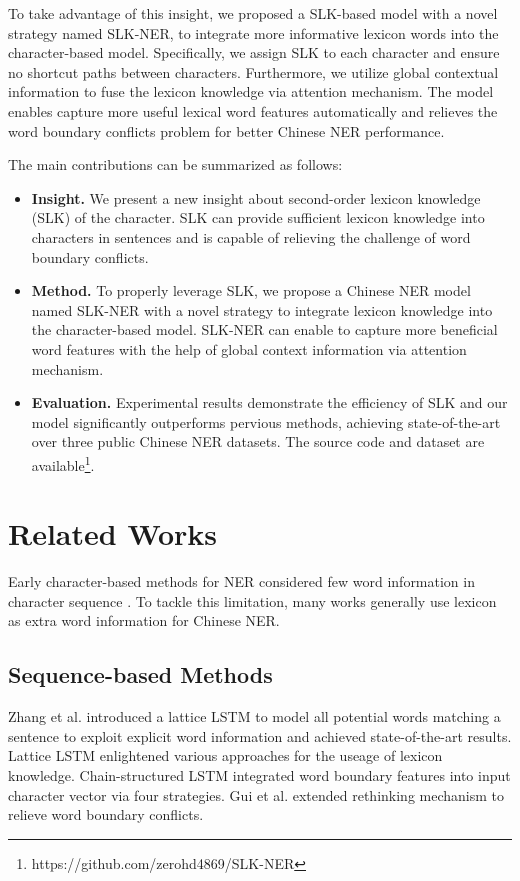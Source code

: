 \documentclass[conference]{IEEEtran}
\begin{document}
To take advantage of this insight, we proposed a SLK-based model with a novel strategy named SLK-NER,
to integrate more informative lexicon words into the character-based model.
Specifically, we assign SLK to each character and ensure no shortcut paths between characters. 
Furthermore, we 
utilize global contextual information to fuse the lexicon knowledge via attention mechanism. 
The model enables capture more useful lexical word features automatically
and relieves the word boundary conflicts problem for better Chinese NER performance.


The main contributions can be summarized as follows:
\begin{itemize}
    \item \textbf{Insight.} 
We present a new insight about second-order lexicon knowledge (SLK) of the character. 
    SLK can provide sufficient lexicon knowledge into characters in sentences
    and is capable of relieving the challenge of word boundary conflicts.
\item \textbf{Method. }
To properly leverage SLK, we propose a Chinese NER model named SLK-NER with a novel strategy
    to integrate lexicon knowledge into the character-based model.
SLK-NER can enable to capture more beneficial word features 
    with the help of global context information via attention mechanism.
    
    \item \textbf{Evaluation.}
Experimental results demonstrate the efficiency of SLK 
    and our model significantly outperforms pervious methods,
     achieving state-of-the-art over three public Chinese NER datasets. 
    The source code and dataset are available\footnote{https://github.com/zerohd4869/SLK-NER}.
\end{itemize}



\section{Related Works}


Early character-based methods for NER considered few word information in character sequence \cite{peng2015named,devlin-etal-2019-bert,huang2015bidirectional,zhu2019can}. 
To tackle this limitation, many works generally use lexicon as extra word information for Chinese NER.



\subsection{Sequence-based Methods}
Zhang et al. \cite{zhang2018chinese} introduced a lattice LSTM to model all potential words matching 
a sentence to exploit explicit word information and achieved state-of-the-art results.
Lattice LSTM enlightened various approaches for the useage of lexicon knowledge.
Chain-structured LSTM \cite{liu2019encoding}  integrated word boundary features into input character vector via four strategies.
Gui et al. \cite{gui2019cnn} extended rethinking mechanism to relieve word boundary conflicts.
\end{document}
